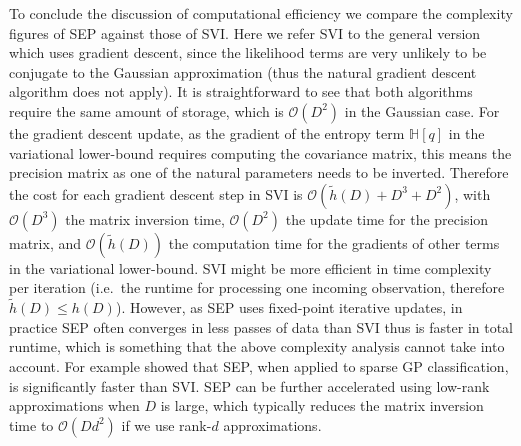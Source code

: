 To conclude the discussion of computational efficiency we compare the complexity figures of SEP against those of SVI. Here we refer SVI to the general version which uses gradient descent, since the likelihood terms are very unlikely to be conjugate to the Gaussian approximation (thus the natural gradient descent algorithm \citep{hoffman:svi2013} does not apply). It is straightforward to see that both algorithms require the same amount of storage, which is $\mathcal{O}(D^2)$ in the Gaussian case. For the gradient descent update, as the gradient of the entropy term $\mathbb{H}[q]$ in the variational lower-bound requires computing the covariance matrix, this means the precision matrix as one of the natural parameters needs to be inverted. Therefore the cost for each gradient descent step in SVI is $\mathcal{O}(\tilde{h}(D) + D^3 + D^2)$, with $\mathcal{O}(D^3)$ the matrix inversion time, $\mathcal{O}(D^2)$ the update time for the precision matrix, and $\mathcal{O}(\tilde{h}(D))$ the computation time for the gradients of other terms in the variational lower-bound.
%
SVI might be more efficient in time complexity per iteration (i.e.~the runtime for processing one incoming observation, therefore $\tilde{h}(D) \leq h(D)$). However, as SEP uses fixed-point iterative updates, in practice SEP often converges in less passes of data than SVI thus is faster in total runtime, which is something that the above complexity analysis cannot take into account. For example \cite{hernandez-lobato:gp2016} showed that SEP, when applied to sparse GP classification, is significantly faster than SVI. SEP can be further accelerated using low-rank approximations when $D$ is large, which typically reduces the matrix inversion time to $\mathcal{O}(Dd^2)$ if we use rank-$d$ approximations.
